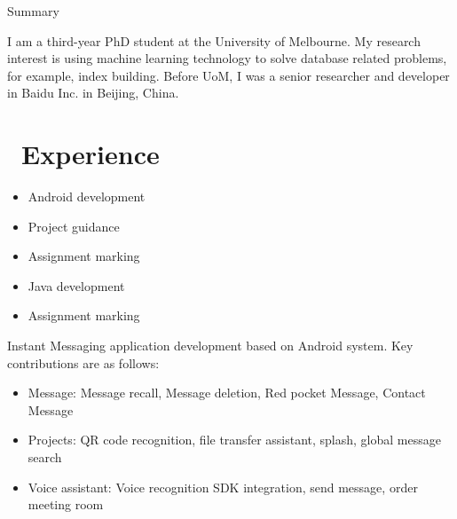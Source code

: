 \documentclass{resume}
\begin{document}



{\color{red}Summary}

I am a third-year PhD student at the University of Melbourne. My research interest is using machine learning
technology to solve database related problems, for example, index building. Before UoM, I was a senior
researcher and developer in Baidu Inc. in Beijing, China.

\section{\faUsers\ Experience}

\begin{itemize}
  \item Android development
    \item Project guidance
  \item Assignment marking
\end{itemize}
\begin{itemize}
  \item Java development
    \item Assignment marking
\end{itemize}

 Instant Messaging application development based on Android system. Key contributions are as follows:
\begin{itemize}
  \item Message: Message recall, Message deletion, Red pocket Message, Contact Message
  \item Projects: QR code recognition, file transfer assistant, splash, global message search 
  \item Voice assistant: Voice recognition SDK integration, send message, order meeting room
\end{itemize}


\end{document}
